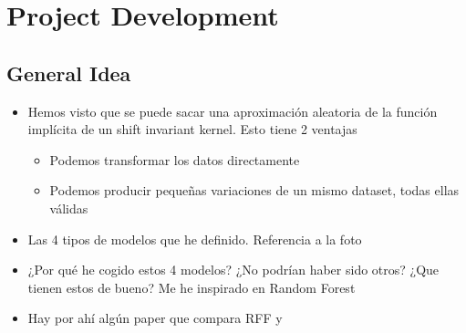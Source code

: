 
\chapter{Project Development} %

\label{Chapter3} %


\section{General Idea}
\begin{note}
  \begin{itemize}
    \item Hemos visto que se puede sacar una aproximación aleatoria de la
    función implícita de un shift invariant kernel. Esto tiene 2 ventajas
    \begin{itemize}
      \item Podemos transformar los datos directamente
      \item Podemos producir pequeñas variaciones de un mismo dataset, todas
      ellas válidas
    \end{itemize}
    \item Las 4 tipos de modelos que he definido. Referencia a la foto
    \item ¿Por qué he cogido estos 4 modelos? ¿No podrían haber sido otros?
    ¿Que tienen estos de bueno? Me he inspirado en Random Forest
    \item Hay por ahí algún paper que compara RFF y \Nys
  \end{itemize}
\end{note}

